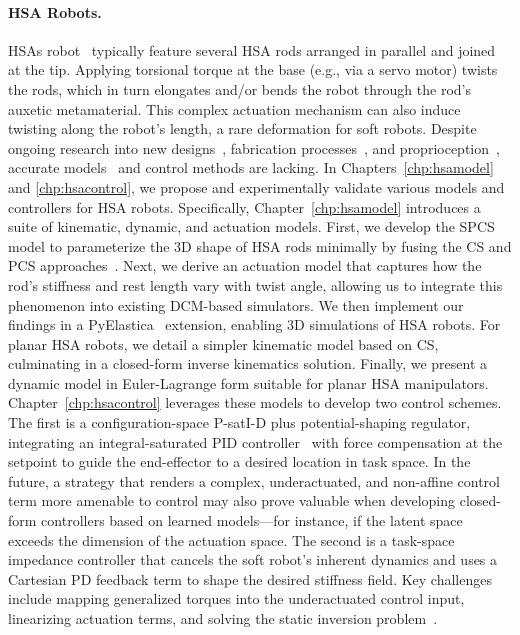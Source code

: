 \paragraph{HSA Robots.}
\glspl{HSA} robot~\cite{lipton2018handedness, chin2018compliant} typically feature several \gls{HSA} rods arranged in parallel and joined at the tip. Applying torsional torque at the base (e.g., via a servo motor) twists the rods, which in turn elongates and/or bends the robot through the rod’s auxetic metamaterial. This complex actuation mechanism can also induce twisting along the robot’s length, a rare deformation for soft robots. Despite ongoing research into new designs~\cite{good2022expanding, good2025torque}, fabrication processes~\cite{truby2021recipe}, and proprioception~\cite{zhang2022vision}, accurate models~\cite{garg2022kinematic} and control methods are lacking. In Chapters~\ref{chp:hsamodel} and \ref{chp:hsacontrol}, we propose and experimentally validate various models and controllers for \gls{HSA} robots.
%
Specifically, Chapter~\ref{chp:hsamodel} introduces a suite of kinematic, dynamic, and actuation models. First, we develop the \gls{SPCS} model to parameterize the 3D shape of \gls{HSA} rods minimally by fusing the \gls{CS} and \gls{PCS} approaches~\cite{renda2018discrete}. Next, we derive an actuation model that captures how the rod’s stiffness and rest length vary with twist angle, allowing us to integrate this phenomenon into existing \gls{DCM}-based simulators. We then implement our findings in a PyElastica~\cite{naughton2021elastica} extension, enabling 3D simulations of \gls{HSA} robots. For planar \gls{HSA} robots, we detail a simpler kinematic model based on \gls{CS}, culminating in a closed-form inverse kinematics solution. Finally, we present a dynamic model in Euler-Lagrange form suitable for planar \gls{HSA} manipulators.
%
Chapter~\ref{chp:hsacontrol} leverages these models to develop two control schemes. The first is a configuration-space P-satI-D plus potential-shaping regulator, integrating an integral-saturated PID controller~\cite{pustina2022p} with force compensation at the setpoint to guide the end-effector to a desired location in task space. 
In the future, a strategy that renders a complex, underactuated, and non-affine control term more amenable to control may also prove valuable when developing closed-form controllers based on learned models—for instance, if the latent space exceeds the dimension of the actuation space.
The second is a task-space impedance controller that cancels the soft robot’s inherent dynamics and uses a Cartesian PD feedback term to shape the desired stiffness field. Key challenges include mapping generalized torques into the underactuated control input, linearizing actuation terms, and solving the static inversion problem~\cite{della2025pushing}.

